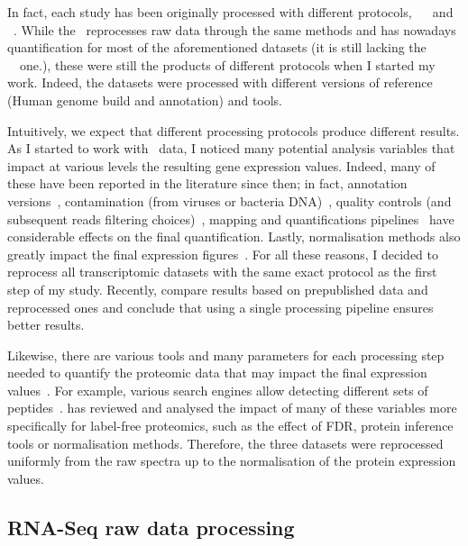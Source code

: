 In fact, each study has been originally processed with different protocols,
\eg\ \gtex{}~ and \castle{}~.
While the \egxa\ reprocesses raw data through the same
methods and has nowadays quantification for most of the aforementioned
datasets (it is still lacking the \castle\ \etal\ one.),
these were still the products of different protocols when I started my work.
Indeed, the datasets were processed with different versions of
reference (Human genome build and annotation) and tools.

Intuitively, we expect that different processing protocols produce
different results.
As I started to work with \Rnaseq\ data,
I noticed many potential analysis variables that impact
at various levels the resulting gene expression values.
Indeed, many of these have been
reported in the literature since then; in fact,
annotation versions~,
contamination (from viruses or bacteria \gls{DNA})~,
quality controls (and subsequent reads filtering choices)~,
mapping and quantifications pipelines~
have considerable effects on the final quantification. Lastly, normalisation
methods also greatly impact the final expression figures~. For all these reasons,
I decided to  reprocess all transcriptomic datasets with the same exact protocol
as the first step of my study.
Recently, \citet{Danielsson2015-cn} compare results based on prepublished data and
reprocessed ones and conclude that using a single processing pipeline ensures better results.

Likewise, there are various tools and many parameters for each processing step
needed to quantify the proteomic data
that may impact the final expression values~.
For example, various search engines allow detecting
different sets of peptides~.
\citet{Mackay2015-zl} has reviewed and analysed the impact
of many of these variables more specifically for label-free proteomics,
such as the effect of \gls{FDR}, protein inference tools or normalisation methods.
Therefore, the three datasets were reprocessed uniformly
from the raw spectra up to the normalisation of the protein expression values.

\subsection{RNA-Seq raw data processing}

